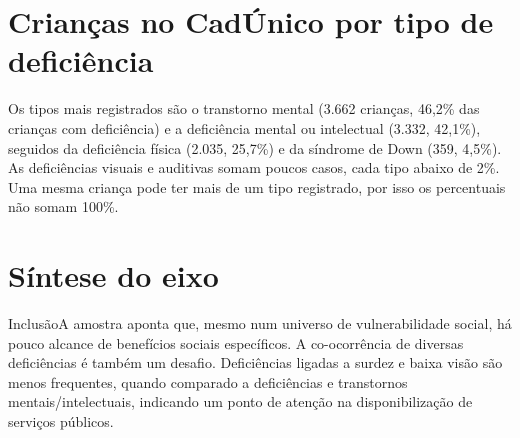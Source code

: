 \section{Crianças no CadÚnico por tipo de deficiência}


Os tipos mais registrados são o transtorno mental (3.662 crianças, 46,2\% das crianças com deficiência) e a deficiência mental ou intelectual (3.332, 42,1\%), seguidos da deficiência física (2.035, 25,7\%) e da síndrome de Down (359, 4,5\%). As deficiências visuais e auditivas somam poucos casos, cada tipo abaixo de 2\%. Uma mesma criança pode ter mais de um tipo registrado, por isso os percentuais não somam 100\%.


\section{Síntese do eixo}

\begin{sintese}{Inclusão}A amostra aponta que, mesmo num universo de vulnerabilidade social, há pouco alcance de benefícios sociais específicos. A co-ocorrência de diversas deficiências é também um desafio. Deficiências ligadas a surdez e baixa visão são menos frequentes, quando comparado a deficiências e transtornos mentais/intelectuais, indicando um ponto de atenção na disponibilização de serviços públicos.\end{sintese}

